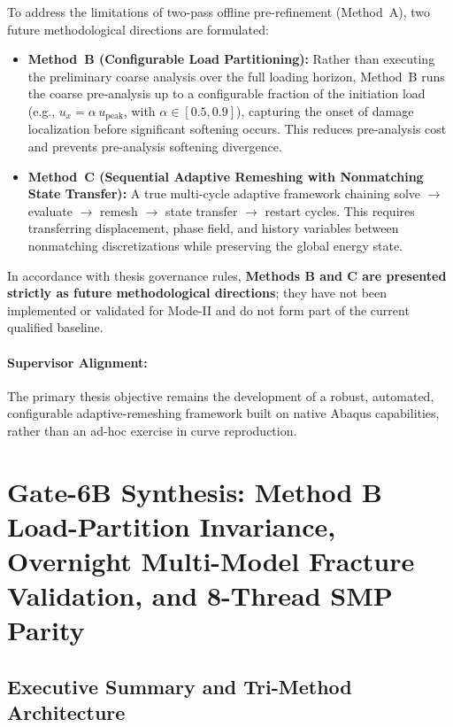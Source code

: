 To address the limitations of two-pass offline pre-refinement (Method~A), two future methodological directions are formulated:
\begin{itemize}
  \item \textbf{Method~B (Configurable Load Partitioning):} Rather than executing the preliminary coarse analysis over the full loading horizon, Method~B runs the coarse pre-analysis up to a configurable fraction of the initiation load (e.g., $u_x = \alpha\,u_{\mathrm{peak}}$, with $\alpha \in [0.5, 0.9]$), capturing the onset of damage localization before significant softening occurs. This reduces pre-analysis cost and prevents pre-analysis softening divergence.
  \item \textbf{Method~C (Sequential Adaptive Remeshing with Nonmatching State Transfer):} A true multi-cycle adaptive framework chaining solve $\to$ evaluate $\to$ remesh $\to$ state transfer $\to$ restart cycles. This requires transferring displacement, phase field, and history variables between nonmatching discretizations while preserving the global energy state.
\end{itemize}
In accordance with thesis governance rules, \textbf{Methods B and C are presented strictly as future methodological directions}; they have not been implemented or validated for Mode-II and do not form part of the current qualified baseline.

\paragraph{Supervisor Alignment:} The primary thesis objective remains the development of a robust, automated, configurable adaptive-remeshing framework built on native Abaqus capabilities, rather than an ad-hoc exercise in curve reproduction.



\section{Gate-6B Synthesis: Method B Load-Partition Invariance, Overnight Multi-Model Fracture Validation, and 8-Thread SMP Parity}
\label{sec:gate6b_synthesis_method_b}

\subsection{Executive Summary and Tri-Method Architecture}
\label{subsec:gate6b_trimethod_architecture}

